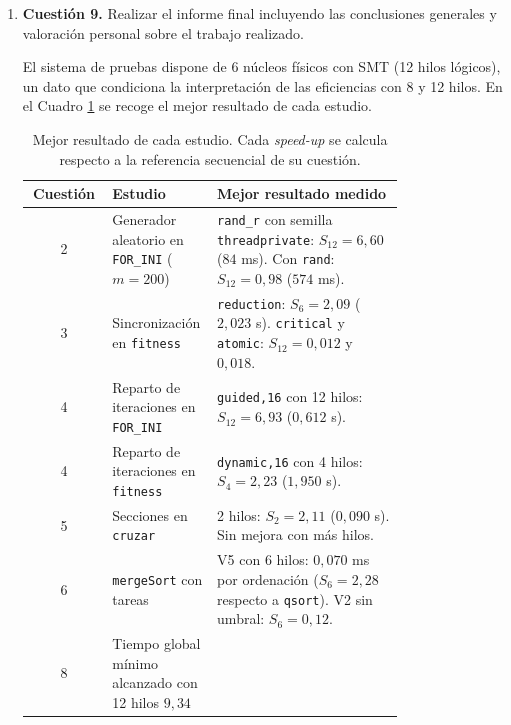 \documentclass[12pt]{article}
\begin{document}
\begin{enumerate}
\newpage

\item \textbf{Cuestión 9.} Realizar el informe final incluyendo las conclusiones generales y valoración personal sobre el trabajo realizado.


El sistema de pruebas dispone de 6 núcleos físicos con SMT (12 hilos lógicos), 
un dato que condiciona la interpretación de las eficiencias con 8 y 12 hilos.
 En el Cuadro \ref{tab:c9_resumen} se recoge el mejor resultado de cada estudio.

\begin{table}[htbp]
    \centering
    \small
    \begin{tabular}{@{}c p{0.28\linewidth} p{0.50\linewidth}@{}}
        \toprule
        \textbf{Cuestión} & \textbf{Estudio} & \textbf{Mejor resultado medido} \\
        \midrule
        2 & Generador aleatorio en \texttt{FOR\_INI} ($m = 200$) & \texttt{rand\_r} con semilla \texttt{threadprivate}: $S_{12} = 6{,}60$ ($84$ ms). Con \texttt{rand}: $S_{12} = 0{,}98$ ($574$ ms). \\
        3 & Sincronización en \texttt{fitness} & \texttt{reduction}: $S_6 = 2{,}09$ ($2{,}023$ s). \texttt{critical} y \texttt{atomic}: $S_{12} = 0{,}012$ y $0{,}018$. \\
        4 & Reparto de iteraciones en \texttt{FOR\_INI} & \texttt{guided,16} con 12 hilos: $S_{12} = 6{,}93$ ($0{,}612$ s). \\
        4 & Reparto de iteraciones en \texttt{fitness} & \texttt{dynamic,16} con 4 hilos: $S_4 = 2{,}23$ ($1{,}950$ s). \\
        5 & Secciones en \texttt{cruzar} & 2 hilos: $S_2 = 2{,}11$ ($0{,}090$ s). Sin mejora con más hilos. \\
        6 & \texttt{mergeSort} con tareas & V5 con 6 hilos: $0{,}070$ ms por ordenación ($S_6 = 2{,}28$ respecto a \texttt{qsort}). V2 sin umbral: $S_6 = 0{,}12$. \\
        8 & Tiempo global mínimo alcanzado con 12 hilos $9{,}34$ \\
        \bottomrule
    \end{tabular}
    \caption{Mejor resultado de cada estudio. Cada \textit{speed-up} se calcula respecto a la referencia secuencial de su cuestión.}
    \label{tab:c9_resumen}
\end{table}



\end{enumerate}
\end{document}
